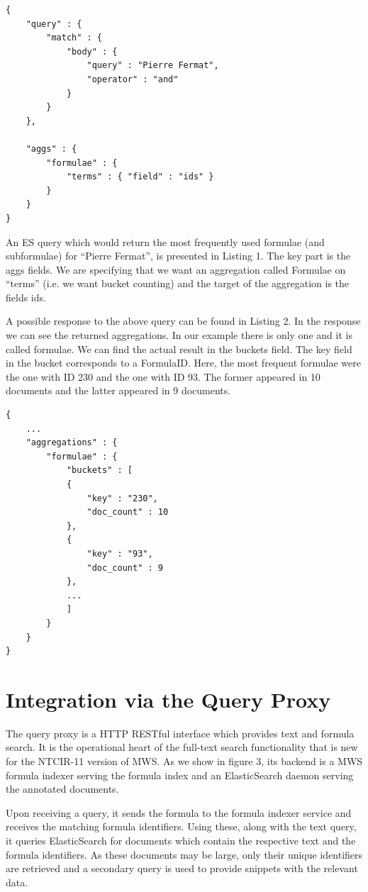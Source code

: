 \documentclass{deliverablereport}
\begin{document}
\begin{lstlisting}[caption={Elastic Search Term Aggregation Query}]
{
	"query" : {
		"match" : {
			"body" : {
				"query" : "Pierre Fermat",
				"operator" : "and"
			}
		}
	},

	"aggs" : {
		"formulae" : {
			"terms" : { "field" : "ids" }
		}
	}
}

\end{lstlisting}

An ES query which would return the most frequently used formulae (and subformulae) for
“Pierre Fermat”, is presented in Listing 1. The key part is the aggs fields. We are
specifying that we want an aggregation called Formulae on “terms” (i.e. we want bucket
counting) and the target of the aggregation is the fields ids. 

A possible response to the above query can be found in Listing 2. In the response we can
see the returned aggregations. In our example there is only one and it is called
formulae. We can find the actual result in the buckets field. The key field in the bucket
corresponds to a FormulaID. Here, the most frequent formulae were the one with ID 230 and
the one with ID 93. The former appeared in 10 documents and the latter appeared in 9
documents.

\begin{lstlisting}[caption={Elastic Search Term Aggregation Response}]
{
	...
	"aggregations" : {
		"formulae" : {
			"buckets" : [
			{
				"key" : "230",
				"doc_count" : 10
			},
			{
				"key" : "93",
				"doc_count" : 9
			},
			...
			]
		}
	}
}
\end{lstlisting}

\section{Integration via the Query Proxy}\label{sec:proxy}

The query proxy is a HTTP RESTful interface which provides text and formula search. It is the operational heart of the full-text search functionality that is new for the NTCIR-11 version of MWS. As we show in figure 3, its backend is a MWS formula indexer serving the formula index and an ElasticSearch daemon serving the annotated documents. 

Upon receiving a query, it sends the formula to the formula indexer service and receives the matching formula identifiers. Using these, along with the text query, it queries ElasticSearch for documents which contain the respective text and the formula identifiers. As these documents may be large, only their unique identifiers are retrieved and a secondary query is used to provide snippets with the relevant data. 
\end{document}
